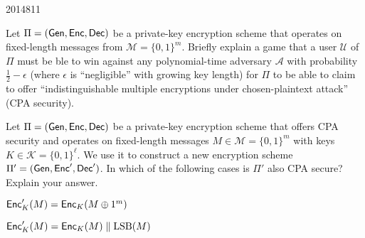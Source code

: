 \documentclass[10pt,\jkfside,a4paper]{article}
\theoremstyle{definition}
\newenvironment{qlist}[1][]{\begin{enumerate}[#1, labelsep=20pt]}{\end{enumerate}}
\newenvironment{question}{\begin{questionbox} \item}{\end{questionbox}}
\begin{document}
\begin{examquestion}{2014}{8}{11}

\begin{qlist}[label=(\textit{\alph*})]

    \begin{question}

        Let $\Pi = (\mathsf{Gen}, \mathsf{Enc}, \mathsf{Dec})$ be a private-key encryption scheme that operates on fixed-length messages from $\mathcal M = \{0, 1\}^m$. Briefly explain a game that a user $\mathcal U$ of $\Pi$ must be ble to win against any polynomial-time adversary $\mathcal A$ with probability $\frac12 - \epsilon$ (where $\epsilon$ is ``negligible'' with growing key length) for $\Pi$ to be able to claim to offer ``indistinguishable multiple encryptions under chosen-plaintext attack'' (CPA security).

    \end{question}


    \begin{question}

        Let $\Pi = (\mathsf{Gen}, \mathsf{Enc}, \mathsf{Dec})$ be a private-key encryption scheme that offers CPA security and operates on fixed-length messages $M \in \mathcal M = \{0, 1\}^m$ with keys $K \in \mathcal K = \{0, 1\}^\ell$. We use it to construct a new encryption scheme $\Pi' = (\mathsf{Gen}, \mathsf{Enc}', \mathsf{Dec}')$. In which of the following cases is $\Pi'$ also CPA secure? Explain your answer.

    \end{question}

    \begin{qlist}[label=(\textit{\roman*})]

        \begin{question}

            $\mathsf{Enc}'_K(M) = \mathsf{Enc}_K(M \oplus 1^m)$

        \end{question}


        \begin{question}

            $\mathsf{Enc}_K'(M) = \mathsf{Enc}_K(M) \parallel \mathrm{LSB}(M)$

        \end{question}


        \begin{question}


\end{question}
\end{qlist}
\end{qlist}
\end{examquestion}
\end{document}
